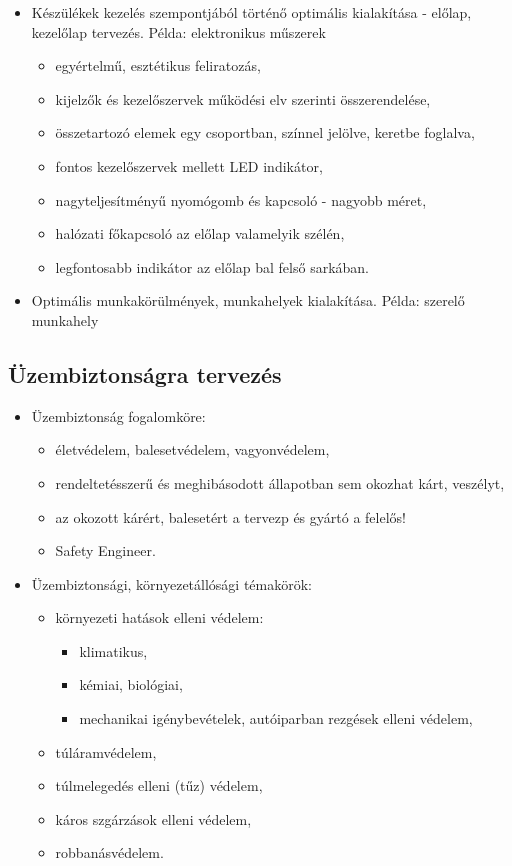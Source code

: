 \documentclass[11pt]{article}
\begin{document}
			\begin{itemize}
				\item Készülékek kezelés szempontjából történő optimális kialakítása - előlap, kezelőlap tervezés. Példa: elektronikus műszerek
				\begin{itemize}
					\item egyértelmű, esztétikus feliratozás,
					\item kijelzők és kezelőszervek működési elv szerinti összerendelése,
					\item összetartozó elemek egy csoportban, színnel jelölve, keretbe foglalva, 
					\item fontos kezelőszervek mellett LED indikátor, 
					\item nagyteljesítményű nyomógomb és kapcsoló - nagyobb méret,
					\item halózati főkapcsoló az előlap valamelyik szélén, 
					\item legfontosabb indikátor az előlap bal felső sarkában.
				\end{itemize}
			\item Optimális munkakörülmények, munkahelyek kialakítása. Példa: szerelő munkahely	
			\end{itemize}

		\subsection{Üzembiztonságra tervezés}
			
			\begin{itemize}
				\item Üzembiztonság fogalomköre:
				\begin{itemize}
					\item életvédelem, balesetvédelem, vagyonvédelem,
					\item rendeltetésszerű és meghibásodott állapotban sem okozhat kárt, veszélyt,
					\item az okozott kárért, balesetért a tervezp és gyártó a felelős!
					\item Safety Engineer.
				\end{itemize}
				\item Üzembiztonsági, környezetállósági témakörök:
				\begin{itemize}
					\item környezeti hatások elleni védelem:
					\begin{itemize}
						\item klimatikus, 
						\item kémiai, biológiai,
						\item mechanikai igénybevételek, autóiparban rezgések elleni védelem,
					\end{itemize}
					\item túláramvédelem,
					\item túlmelegedés elleni (tűz) védelem,
					\item káros szgárzások elleni védelem, 
					\item robbanásvédelem.
				\end{itemize}
			\end{itemize}
\end{document}
